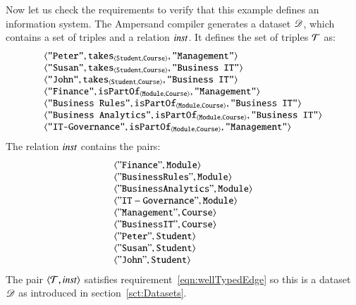 \documentclass{elsarticle}
\begin{document}
   Now let us check the requirements to verify that this example defines an information system.
   The Ampersand compiler generates a dataset $\mathscr{D}$, which contains a set of triples and a relation $\mathbin{\text{\it inst\/}}$.
   It defines the set of triples $\mathcal{T}$ as:
\[\begin{array}[t]{l}
   \langle{\text{\tt "Peter"}},{\text{\it \text{\tt takes}\/}_{\langle{\text{\tt Student}},{\text{\tt Course}}\rangle}},{\text{\tt "Management"}}\rangle\\
   \langle{\text{\tt "Susan"}},{\text{\it \text{\tt takes}\/}_{\langle{\text{\tt Student}},{\text{\tt Course}}\rangle}},{\text{\tt "Business IT"}}\rangle\\
   \langle{\text{\tt "John"}},{\text{\it \text{\tt takes}\/}_{\langle{\text{\tt Student}},{\text{\tt Course}}\rangle}},{\text{\tt "Business IT"}}\rangle\\
   \langle{\text{\tt "Finance"}},{\text{\it \text{\tt isPartOf}\/}_{\langle{\text{\tt Module}},{\text{\tt Course}}\rangle}},{\text{\tt "Management"}}\rangle\\
   \langle{\text{\tt "Business Rules"}},{\text{\it \text{\tt isPartOf}\/}_{\langle{\text{\tt Module}},{\text{\tt Course}}\rangle}},{\text{\tt "Business IT"}}\rangle\\
   \langle{\text{\tt "Business Analytics"}},{\text{\it \text{\tt isPartOf}\/}_{\langle{\text{\tt Module}},{\text{\tt Course}}\rangle}},{\text{\tt "Business IT"}}\rangle\\
   \langle{\text{\tt "IT-Governance"}},{\text{\it \text{\tt isPartOf}\/}_{\langle{\text{\tt Module}},{\text{\tt Course}}\rangle}},{\text{\tt "Management"}}\rangle
\end{array}\]
The relation $\mathbin{\text{\it inst\/}}$ contains the pairs:
\[\begin{array}{l}
   \langle{\tt "Finance"},{\tt Module}\rangle\\
   \langle{\tt "Business Rules"},{\tt Module}\rangle\\
   \langle{\tt "Business Analytics"},{\tt Module}\rangle\\
   \langle{\tt "IT-Governance"},{\tt Module}\rangle\\
   \langle{\tt "Management"},{\tt Course}\rangle\\
   \langle{\tt "Business IT"},{\tt Course}\rangle\\
   \langle{\tt "Peter"},{\tt Student}\rangle\\
   \langle{\tt "Susan"},{\tt Student}\rangle\\
   \langle{\tt "John"},{\tt Student}\rangle
\end{array}\]
   The pair $\langle{\mathcal{T}},{\mathbin{\text{\it inst\/}}}\rangle$ satisfies requirement~\ref{eqn:wellTypedEdge} so this is a dataset $\mathscr{D}$ as introduced in section~\ref{sct:Datasets}.
\end{document}
